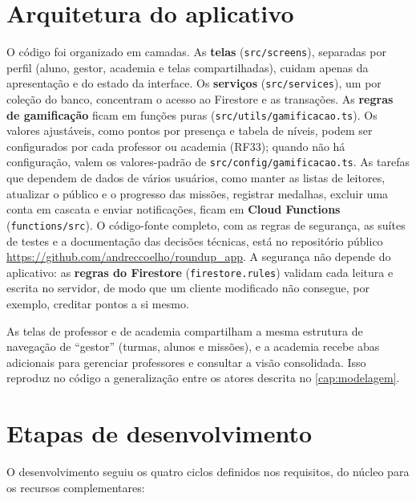 \section{Arquitetura do aplicativo}

O código foi organizado em camadas. As \textbf{telas}
(\texttt{src/screens}), separadas por perfil (aluno, gestor, academia e
telas compartilhadas), cuidam apenas da apresentação e do estado da
interface. Os \textbf{serviços} (\texttt{src/services}), um por coleção do
banco, concentram o acesso ao Firestore e as transações. As
\textbf{regras de gamificação} ficam em funções puras
(\texttt{src/utils/gamificacao.ts}). Os valores ajustáveis, como pontos
por presença e tabela de níveis, podem ser configurados por cada professor
ou academia (RF33); quando não há configuração, valem os valores-padrão
de \texttt{src/config/gamificacao.ts}. As tarefas que dependem de dados de
vários usuários, como manter as listas de leitores, atualizar o público e o
progresso das missões, registrar medalhas, excluir uma conta em cascata e
enviar notificações, ficam em
\textbf{Cloud Functions} (\texttt{functions/src}). O código-fonte
completo, com as regras de segurança, as suítes de testes e a
documentação das decisões técnicas, está no repositório público
\url{https://github.com/andreccoelho/roundup_app}. A segurança não depende do
aplicativo: as \textbf{regras do Firestore} (\texttt{firestore.rules})
validam cada leitura e escrita no servidor, de modo que um cliente
modificado não consegue, por exemplo, creditar pontos a si mesmo.

As telas de professor e de academia compartilham a mesma estrutura de
navegação de ``gestor'' (turmas, alunos e missões), e a academia recebe
abas adicionais para gerenciar professores e consultar a visão
consolidada. Isso reproduz no código a generalização entre os atores
descrita no \autoref{cap:modelagem}.

\section{Etapas de desenvolvimento}

O desenvolvimento seguiu os quatro ciclos definidos nos requisitos, do
núcleo para os recursos complementares:

